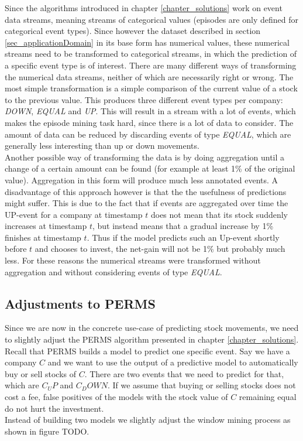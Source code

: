 Since the algorithms introduced in chapter \ref{chapter_solutions} work on event data streams, meaning streams of categorical values (episodes are only defined for categorical event types). Since however the dataset described in section \ref{sec_applicationDomain} in its base form has numerical values, these numerical streams need to be transformed to categorical streams, in which the prediction of a specific event type is of interest. There are many different ways of transforming the numerical data streams, neither of which are necessarily right or wrong. The most simple transformation is a simple comparison of the current value of a stock to the previous value. This produces three different event types per company: \textit{DOWN}, \textit{EQUAL} and \textit{UP}. This will result in a stream with a lot of events, which makes the episode mining task hard, since there is a lot of data to consider. The amount of data can be reduced by discarding events of type \textit{EQUAL}, which are generally less interesting than up or down movements. \\
Another possible way of transforming the data is by doing aggregation until a change of a certain amount can be found (for example at least 1\% of the original value). Aggregation in this form will produce much less annotated events. A disadvantage of this approach however is that the the usefulness of predictions might suffer. This is due to the fact that if events are aggregated over time the UP-event for a company at timestamp $t$ does not mean that its stock suddenly increases at timestamp $t$, but instead means that a gradual increase by 1\% finishes at timestamp $t$. Thus if the model predicts such an Up-event shortly before $t$ and chooses to invest, the net-gain will not be 1\% but probably much less. For these reasons the numerical streams were transformed without aggregation and without considering events of type \textit{EQUAL}.

\subsection{Adjustments to PERMS}
Since we are now in the concrete use-case of predicting stock movements, we need to slightly adjust the PERMS algorithm presented in chapter \ref{chapter_solutions}. Recall that PERMS builds a model to predict one specific event. Say we have a company $C$ and we want to use the output of a predictive model to automatically buy or sell stocks of $C$. There are two events that we need to predict for that, which are $C_UP$ and $C_DOWN$. If we assume that buying or selling stocks does not cost a fee, false positives of the models with the stock value of $C$ remaining equal do not hurt the investment. \\
Instead of building two models we slightly adjust the window mining process as shown in figure TODO.


